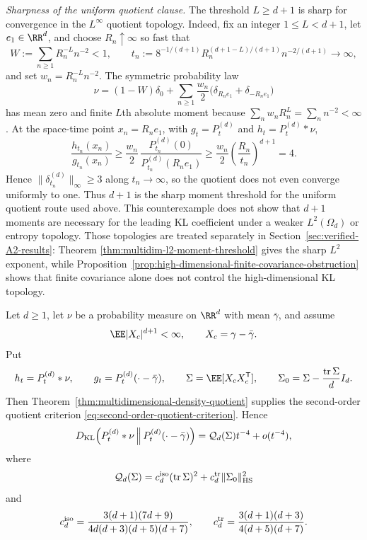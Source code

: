 \noindent\emph{Sharpness of the uniform quotient clause.}
The threshold \(L\ge d+1\) is sharp for convergence in the
\(L^\infty\) quotient topology.  Indeed, fix an integer
\(1\le L<d+1\), let \(e_1\in\RR^d\), and choose \(R_n\uparrow\infty\) so
fast that
\[
  W:=\sum_{n\ge1}R_n^{-L}n^{-2}<1,
  \qquad
  t_n:=8^{-1/(d+1)}
  R_n^{(d+1-L)/(d+1)}n^{-2/(d+1)}\to\infty,
\]
and set \(w_n=R_n^{-L}n^{-2}\).  The symmetric probability law
\[
  \nu=(1-W)\delta_0
  +\sum_{n\ge1}\frac{w_n}{2}
  \bigl(\delta_{R_ne_1}+\delta_{-R_ne_1}\bigr)
\]
has mean zero and finite \(L\)th absolute moment because
\(\sum_n w_nR_n^L=\sum_n n^{-2}<\infty\).  At the space-time point
\(x_n=R_ne_1\), with \(g_t=P_t^{(d)}\) and \(h_t=P_t^{(d)}*\nu\),
\[
\frac{h_{t_n}(x_n)}{g_{t_n}(x_n)}
\ge
\frac{w_n}{2}\,
\frac{P_{t_n}^{(d)}(0)}{P_{t_n}^{(d)}(R_ne_1)}
\ge
\frac{w_n}{2}\left(\frac{R_n}{t_n}\right)^{d+1}
=4 .
\]
Hence \(\|\delta_{t_n}^{(d)}\|_\infty\ge3\) along \(t_n\to\infty\), so
the quotient does not even converge uniformly to one.  Thus \(d+1\) is the
sharp moment threshold for the uniform quotient route used above.  This
counterexample does not show that \(d+1\) moments are necessary for the
leading KL coefficient under a weaker \(L^2(\Omega_d)\) or entropy topology.
Those topologies are treated separately in
Section~\ref{sec:verified-A2-results}: Theorem
\ref{thm:multidim-l2-moment-threshold} gives the sharp \(L^2\) exponent,
while Proposition~\ref{prop:high-dimensional-finite-covariance-obstruction}
shows that finite covariance alone does not control the high-dimensional KL
topology.

\begin{corollary}%
\label{cor:finite-dplusone-moment-leading-multidim-coefficient}
Let \(d\ge1\), let \(\nu\) be a probability measure on \(\RR^d\) with mean
\(\bar{\gamma}\), and assume
\[
  \EE |X_c|^{d+1}<\infty,\qquad X_c=\gamma-\bar{\gamma} .
\]
Put
\[
  h_t=P_t^{(d)}*\nu,\qquad
  g_t=P_t^{(d)}(\cdot-\bar{\gamma}),\qquad
  \Sigma=\EE[X_cX_c^{\mathsf T}],\qquad
  \Sigma_0=\Sigma-\frac{\operatorname{tr}\Sigma}{d}I_d .
\]
Then Theorem~\ref{thm:multidimensional-density-quotient} supplies the
second-order quotient criterion
\eqref{eq:second-order-quotient-criterion}.  Hence
\[
D_{\rm KL}\!\left(P_t^{(d)}*\nu\,\middle\|\,
P_t^{(d)}(\cdot-\bar{\gamma})\right)
=\mathcal Q_d(\Sigma)t^{-4}+o(t^{-4}),
\]
where
\[
\mathcal Q_d(\Sigma)
=c_d^{\rm iso}(\operatorname{tr}\Sigma)^2
+c_d^{\rm tr}\|\Sigma_0\|_{\rm HS}^2
\]
and
\[
c_d^{\rm iso}=
\frac{3(d+1)(7d+9)}
{4d(d+3)(d+5)(d+7)},
\qquad
c_d^{\rm tr}=
\frac{3(d+1)(d+3)}
{4(d+5)(d+7)} .
\]
\end{corollary}

